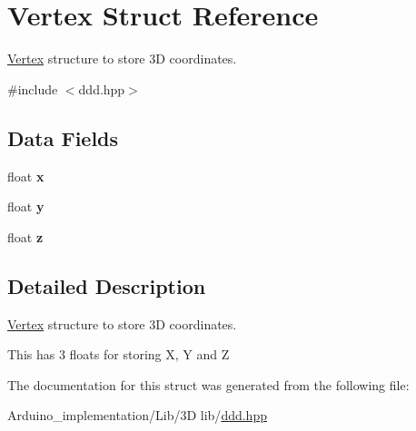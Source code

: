 \hypertarget{structVertex}{\section{Vertex Struct Reference}
\label{structVertex}
}


\hyperlink{structVertex}{Vertex} structure to store 3\+D coordinates.  




{\ttfamily \#include $<$ddd.\+hpp$>$}

\subsection*{Data Fields}
\begin{DoxyCompactItemize}
\item 
\hypertarget{structVertex_aa592e1564aa3b226ff629b824b240310}{float {\bfseries x}}\label{structVertex_aa592e1564aa3b226ff629b824b240310}

\item 
\hypertarget{structVertex_a448817068556fe43e81dc0a3e7d1fa43}{float {\bfseries y}}\label{structVertex_a448817068556fe43e81dc0a3e7d1fa43}

\item 
\hypertarget{structVertex_af5d14cd74cd842c01f9a8a8d92325339}{float {\bfseries z}}\label{structVertex_af5d14cd74cd842c01f9a8a8d92325339}

\end{DoxyCompactItemize}


\subsection{Detailed Description}
\hyperlink{structVertex}{Vertex} structure to store 3\+D coordinates. 

This has 3 floats for storing X, Y and Z 

The documentation for this struct was generated from the following file\+:\begin{DoxyCompactItemize}
\item 
Arduino\+\_\+implementation/\+Lib/3\+D lib/\hyperlink{ddd_8hpp}{ddd.\+hpp}\end{DoxyCompactItemize}
